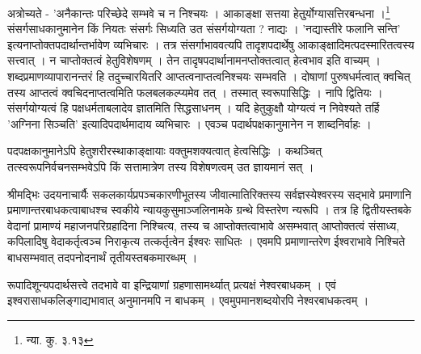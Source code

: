 अत्रोच्यते - 'अनैकान्तः परिच्छेदे सम्भवे च न निश्चयः । आकाङ्क्षा सत्तया हेतुर्योग्यासत्तिरबन्धना ।\footnote{न्या. कु. ३.१३} संसर्गसाधकानुमानेन किं नियतः संसर्गः सिध्यति उत संसर्गयोग्यता ? नाद्यः । 'नद्यास्तीरे फलानि सन्ति' इत्यनाप्तोक्तपदार्थान्तर्भावेण व्यभिचारः । तत्र संसर्गाभाववत्यपि तादृशपदार्थेषु आकाङ्क्षादिमत्पदस्मारितत्वस्य सत्त्वात् । न चाप्तोक्तत्वं हेतुविशेषणम् । तेन तादृषपदार्थानामनप्तोक्तत्वात् हेत्वभाव इति वाच्यम् । शब्दप्रमाणव्यापारानन्तरं हि तदुच्चारयितरि आप्तत्वनाप्तत्वनिश्चयः सम्भवति । दोषाणां‌ पुरुषधर्मत्वात् क्वचित् तस्य आप्तत्वं क्वचिदनाप्तत्वमिति फलबलकल्प्यमेव तत् । तस्मात् स्वरूपासिद्धिः । नापि द्वितियः । संसर्गयोग्यत्वं हि पक्षधर्मताबलादेव ज्ञातमिति सिद्धसाधनम् । यदि हेतुकुक्षौ योग्यत्वं न निवेश्यते तर्हि 'अग्निना सिञ्चति' इत्यादिपदार्थमादाय व्यभिचारः‌ । एवञ्च पदार्थपक्षकानुमानेन न शाब्दनिर्वाहः ।

पदपक्षकानुमानेऽपि हेतुशरीरस्थाकाङ्क्षायाः वक्तुमशक्यत्वात् हेत्वसिद्धिः । कथञ्चित् तत्स्वरूपनिर्वचनसम्भवेऽपि किं‌ सत्तामात्रेण तस्य विशेषणत्वम् उत ज्ञायमानं सत् ।




श्रीमद्भिः उदयनाचार्यैः सकलकार्यप्रपञ्चकारणीभूतस्य जीवात्मातिरिक्तस्य सर्वज्ञस्येश्वरस्य सद्भावे प्रमाणानि प्रमाणान्तरबाधकत्वाबाधश्च स्वकीये न्यायकुसुमाञ्जलिनामके ग्रन्थे विस्तरेण न्यरूपि । तत्र हि द्वितीयस्तबके वेदानां प्रामाण्यं महाजनपरिग्रहादिना निश्चित्य, तस्य च आप्तोक्तत्वाभावे असम्भवात् आप्तोक्तत्वं संसाध्य, कपिलादिषु वेदाकर्तृत्वञ्च निराकृत्य तत्कर्तृत्वेन ईश्वरः साधितः । एवमपि प्रमाणान्तरेण ईश्वराभावे निश्चिते बाधसम्भवात् तदपनोदनार्थं तृतीयस्तबकमारब्धम् ।

रूपादिशून्यपदार्थसत्त्वे तदभावे वा इन्द्रियाणां ग्रहणासामर्थ्यात् प्रत्यक्षं नेश्वरबाधकम् । एवं इश्वरासाधकलिङ्गाद्यभावात् अनुमानमपि न बाधकम् । एवमुपमानशब्दयोरपि नेश्वरबाधकत्वम् ।
